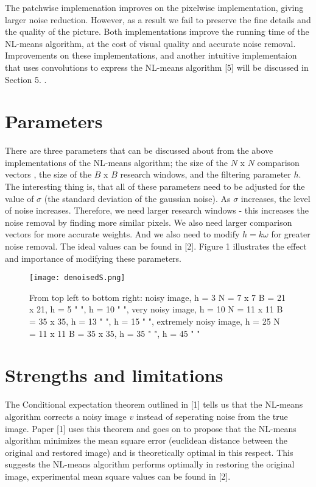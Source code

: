 \documentclass[11pt, twocolumn]{article}
\begin{document}
The patchwise implemenation improves on the pixelwise implementation, giving larger noise reduction. However, as a result we fail to preserve the fine details and the quality of the picture. Both implementations improve the running time of the NL-means algorithm, at the cost of visual quality and accurate noise removal. Improvements on these implementations, and another intuitive implementaion that uses convolutions to express the NL-means algorithm [5] will be discussed in Section 5. .
\section{Parameters}
There are three parameters that can be discussed about from the above implementations of the NL-means algorithm; the size of the $N$ x $N$ comparison vectors , the size of the $B$ x $B$ research windows, and the filtering parameter $h$. The interesting thing is, that all of these parameters need to be adjusted for the value of $\sigma$ (the standard deviation of the gaussian noise). As $\sigma$ increases, the level of noise increases. Therefore, we need larger research windows - this increases the noise removal by finding more similar pixels. We also need larger comparison vectors for more accurate weights. And we also need to modify $h = k \omega$ for greater noise removal. The ideal values can be found in [2]. Figure 1 illustrates the effect and importance of modifying these parameters.
\begin{figure}[h]
\texttt{[image: denoisedS.png]}
\caption{From top left to bottom right: noisy image, h = 3 N = 7 x 7 B = 21 x 21, h = 5 " ", h = 10 " ", very noisy image, h = 10 N = 11 x 11 B = 35 x 35, h = 13 " ", h = 15 " ", extremely noisy image, h = 25 N = 11 x 11 B = 35 x 35, h = 35 " ", h = 45 " "}
\end{figure}
\section{Strengths and limitations}
The Conditional expectation theorem outlined in [1] tells us that the NL-means algorithm corrects a noisy image $v$ instead of seperating noise from the true image. Paper [1] uses this theorem and goes on to propose that the NL-means algorithm minimizes the mean square error (euclidean distance between the original and restored image) and is theoretically optimal in this respect. This suggests the NL-means algorithm performs optimally in restoring the original image, experimental mean square values can be found in [2].
\end{document}
